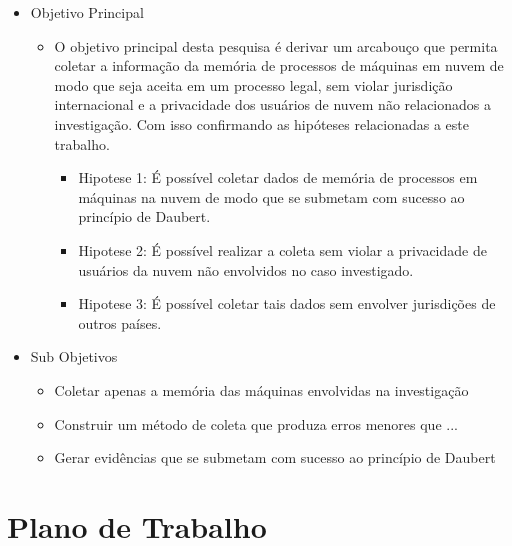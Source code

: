 \documentclass[
	12pt,				%
	openright,			%
	oneside,			%
	a4paper,			%
	english,			%
	french,				%
	spanish,			%
	brazil,				%
	]{abntex2}
\begin{document}
\begin{itemize}
 \item Objetivo Principal

 \begin{itemize}
  \item O objetivo principal desta pesquisa é derivar um arcabouço que permita coletar a informação da memória de processos de máquinas em nuvem de modo que seja aceita em um processo legal,
 sem violar jurisdição internacional e a privacidade dos usuários de nuvem não relacionados a investigação. Com isso confirmando as hipóteses relacionadas a este trabalho.
 
 \begin{itemize}
  \item Hipotese 1: É possível coletar dados de memória de processos em máquinas na nuvem de modo que se submetam com sucesso ao princípio de Daubert.
  \item Hipotese 2: É possível realizar a coleta sem violar a privacidade de usuários da nuvem não envolvidos no caso investigado.
  \item Hipotese 3: É possível coletar tais dados sem envolver jurisdições de outros países.
 \end{itemize}
 
 \end{itemize}
 
\end{itemize}

\begin{itemize}
 \item Sub Objetivos

 \begin{itemize}
  \item Coletar apenas a memória das máquinas envolvidas na investigação
  \item Construir um método de coleta que produza erros menores que ...
  \item Gerar evidências que se submetam com sucesso ao princípio de Daubert
 \end{itemize}
 
\end{itemize}


\chapter{Plano de Trabalho}
\end{document}
